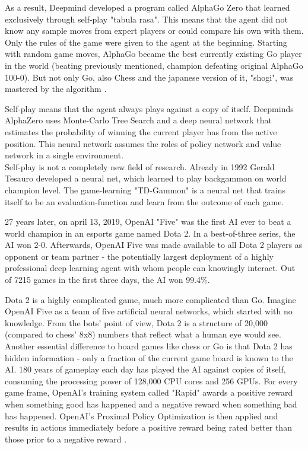 As a result, Deepmind developed a program called AlphaGo Zero that learned exclusively through self-play "tabula rasa". This means that the agent did not know any sample moves from expert players or could compare his own with them. Only the rules of the game were given to the agent at the beginning. Starting with random game moves, AlphaGo became the best currently existing Go player in the world (beating previously mentioned, champion defeating original AlphaGo 100-0). But not only Go, also Chess and the japanese version of it, "shogi", was mastered by the algorithm \cite{chessSilver2017mastering,GoalphaGosilver2017mastering}. 

Self-play means that the agent always plays against a copy of itself.
Deepminds AlphaZero uses Monte-Carlo Tree Search \cite{montecarlobrowne2012survey} and a deep neural network that estimates the probability of winning the current player has from the active position. This neural network assumes the roles of policy network and value network in a single environment.
\\
Self-play is not a completely new field of research. Already in 1992 Gerald Tesauro \cite{TDGammontesauro1992practical,TD2Gammontesauro1995temporal} developed a neural net, which learned to play backgammon on world champion level. The game-learning "TD-Gammon" is a neural net that trains itself to be an evaluation-function and learn from the outcome of each game.

27 years later, on april 13, 2019, OpenAI "Five" was the first AI ever to beat a world champion in an esports game named Dota 2. In a best-of-three series, the AI won 2-0. Afterwards, OpenAI Five was made available to all Dota 2 players as opponent or team partner - the potentially largest deployment of a highly professional deep learning agent with whom people can knowingly interact. Out of 7215 games in the first three days, the AI won 99.4\%\cite{dotaOpenAI2019Jun}.

Dota 2 is a highly complicated game, much more complicated than Go. Imagine OpenAI Five as a team of five artificial neural networks, which started with no knowledge. From the bots' point of view, Dota 2 is a structure of 20,000 (compared to chess' 8x8) numbers that reflect what a human eye would see. Another essential difference to board games like chess or Go is that Dota 2 has hidden information - only a fraction of the current game board is known to the AI. 180 years of gameplay each day has played the AI against copies of itself, consuming the processing power of 128,000 CPU cores and 256 GPUs. For every game frame, OpenAI's training system called "Rapid" awards a positive reward when something good has happened and a negative reward when something bad has happened. OpenAI's Proximal Policy Optimization \cite{ppoSchulman2019Mar} is then applied and results in actions immediately before a positive reward being rated better than those prior to a negative reward \cite{dotaOpenAI2019Jun}.

